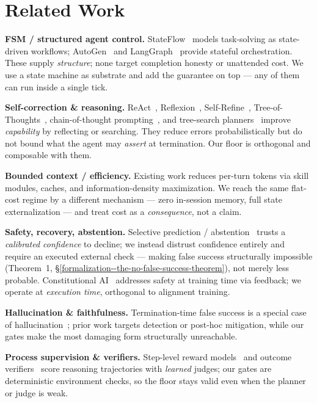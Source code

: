 \section{Related Work}\label{related-work}

\textbf{FSM / structured agent control.} StateFlow~\citep{wu2024stateflow} models task-solving as state-driven
workflows; AutoGen~\citep{wu2023autogen} and LangGraph~\citep{langgraph2024} provide stateful orchestration.
These supply \emph{structure}; none target completion honesty or
unattended cost. We use a state machine as substrate and add the guarantee on top --- any of them can run
inside a single tick.

\textbf{Self-correction \& reasoning.} ReAct~\citep{yao2023react}, Reflexion~\citep{shinn2023reflexion},
Self-Refine~\citep{madaan2023selfrefine}, Tree-of-Thoughts~\citep{yao2023tot}, chain-of-thought
prompting~\citep{wei2022cot}, and tree-search planners~\citep{huang2024planning} improve
\emph{capability} by reflecting or searching. They reduce errors probabilistically but do not bound what the
agent may \emph{assert} at termination. Our floor is orthogonal and composable with them.

\textbf{Bounded context / efficiency.} Existing work reduces per-turn tokens via skill modules, caches, and
information-density maximization. We reach the same flat-cost regime by a different mechanism --- zero
in-session memory, full state externalization --- and treat cost as a \emph{consequence}, not a claim.

\textbf{Safety, recovery, abstention.} Selective
prediction / abstention~\citep{geifman2017selective, kadavath2022know} trusts a \emph{calibrated confidence} to decline; we
instead distrust confidence entirely and require an executed external check --- making false success
structurally impossible (Theorem~1, \S\ref{formalization--the-no-false-success-theorem}), not merely less probable.
Constitutional AI~\citep{bai2022constitutional} addresses safety at training time via feedback; we operate at
\emph{execution time}, orthogonal to alignment training.

\textbf{Hallucination \& faithfulness.} Termination-time false success is a special case of
hallucination~\citep{maynez2020faithfulness, ji2023halluc, huang2023halluc, min2023factscore}; prior work
targets detection or post-hoc mitigation, while our gates make the most damaging form structurally unreachable.

\textbf{Process supervision \& verifiers.} Step-level reward models~\citep{lightman2023verify} and outcome
verifiers~\citep{cobbe2021gsm8k} score reasoning trajectories with \emph{learned} judges; our gates are
deterministic environment checks, so the floor stays valid even when the planner or judge is weak.

